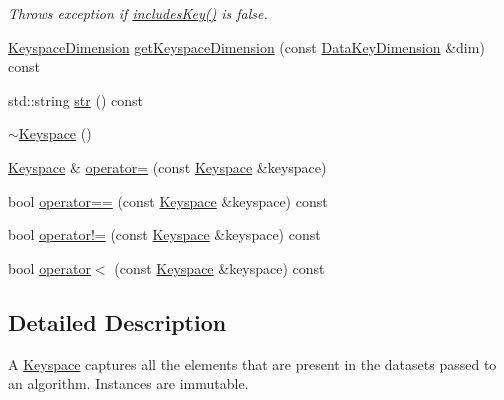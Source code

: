 \begin{DoxyCompactItemize}
\begin{DoxyCompactList}\small\item\em Throws exception if \hyperlink{classBUSBOY_1_1Keyspace_a76c9ccb68e6856806ef0099fd866cf0f}{includesKey()} is false. \item\end{DoxyCompactList}\item 
\hyperlink{classBUSBOY_1_1KeyspaceDimension}{KeyspaceDimension} \hyperlink{classBUSBOY_1_1Keyspace_a8758b9fc44586313eb03afd29c25fdb2}{getKeyspaceDimension} (const \hyperlink{classBUSBOY_1_1DataKeyDimension}{DataKeyDimension} \&dim) const 
\item 
std::string \hyperlink{classBUSBOY_1_1Keyspace_a29cb418681c7d09801c6d833dd1ddae9}{str} () const 
\item 
\hyperlink{classBUSBOY_1_1Keyspace_a37daef1ada6348093cce7c0d59fc8b9a}{$\sim$Keyspace} ()
\item 
\hyperlink{classBUSBOY_1_1Keyspace}{Keyspace} \& \hyperlink{classBUSBOY_1_1Keyspace_a2079515350d37073f129e62cf9a0dabf}{operator=} (const \hyperlink{classBUSBOY_1_1Keyspace}{Keyspace} \&keyspace)
\item 
bool \hyperlink{classBUSBOY_1_1Keyspace_aaf939c1fd29c7ffdb90010480bfc0c83}{operator==} (const \hyperlink{classBUSBOY_1_1Keyspace}{Keyspace} \&keyspace) const 
\item 
bool \hyperlink{classBUSBOY_1_1Keyspace_a30fc123ce384d6ef6573e89598adb360}{operator!=} (const \hyperlink{classBUSBOY_1_1Keyspace}{Keyspace} \&keyspace) const 
\item 
bool \hyperlink{classBUSBOY_1_1Keyspace_ad1c49e682de775354b2d9e28e2833b1c}{operator$<$} (const \hyperlink{classBUSBOY_1_1Keyspace}{Keyspace} \&keyspace) const 
\end{DoxyCompactItemize}


\subsection{Detailed Description}
A \hyperlink{classBUSBOY_1_1Keyspace}{Keyspace} captures all the elements that are present in the datasets passed to an algorithm. Instances are immutable. 


